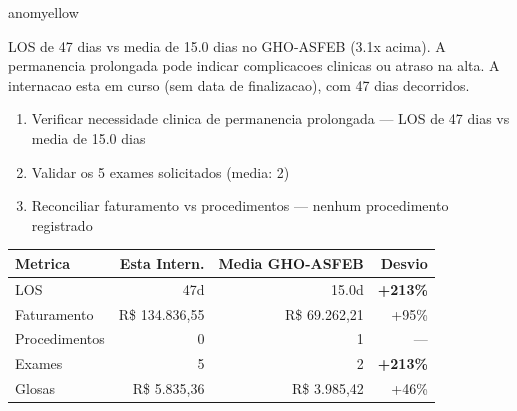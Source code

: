 \documentclass[a4paper,10pt]{article}
\begin{document}
\begin{anomalycard}[Internacao 696 | GHO-ASFEB | MODERADO (z=2.66)]{anomyellow}
\vspace{2pt}\begin{tcolorbox}[colback=severityred!20,colframe=anomyellow,title={\textbf{Interpretacao de Negocio}},fonttitle=\bfseries\small,left=4pt,right=4pt,top=3pt,bottom=3pt]
{\small LOS de 47 dias vs media de 15.0 dias no GHO-ASFEB (3.1x acima). A permanencia prolongada pode indicar complicacoes clinicas ou atraso na alta. A internacao esta em curso (sem data de finalizacao), com 47 dias decorridos.}
\end{tcolorbox}
\begin{tcolorbox}[colback=severityyellow!30,colframe=anomorange,title={\textbf{Recomendacoes Especificas}},fonttitle=\bfseries\small,left=4pt,right=4pt,top=3pt,bottom=3pt]
\begin{enumerate}[nosep,leftmargin=16pt]
\item {\small Verificar necessidade clinica de permanencia prolongada --- LOS de 47 dias vs media de 15.0 dias}
\item {\small Validar os 5 exames solicitados (media: 2)}
\item {\small Reconciliar faturamento vs procedimentos --- nenhum procedimento registrado}
\end{enumerate}
\end{tcolorbox}
\begin{center}\begin{tabular}{l r r r}\toprule\textbf{Metrica} & \textbf{Esta Intern.} & \textbf{Media GHO-ASFEB} & \textbf{Desvio} \\\midrule
LOS & 47d & 15.0d & \textcolor{anomred}{\textbf{+213\%}} \\
Faturamento & R\$ 134.836,55 & R\$ 69.262,21 & \textcolor{anomorange}{+95\%} \\
Procedimentos & 0 & 1 & --- \\
Exames & 5 & 2 & \textcolor{anomred}{\textbf{+213\%}} \\
Glosas & R\$ 5.835,36 & R\$ 3.985,42 & +46\% \\
\bottomrule\end{tabular}\end{center}


\end{anomalycard}
\end{document}
